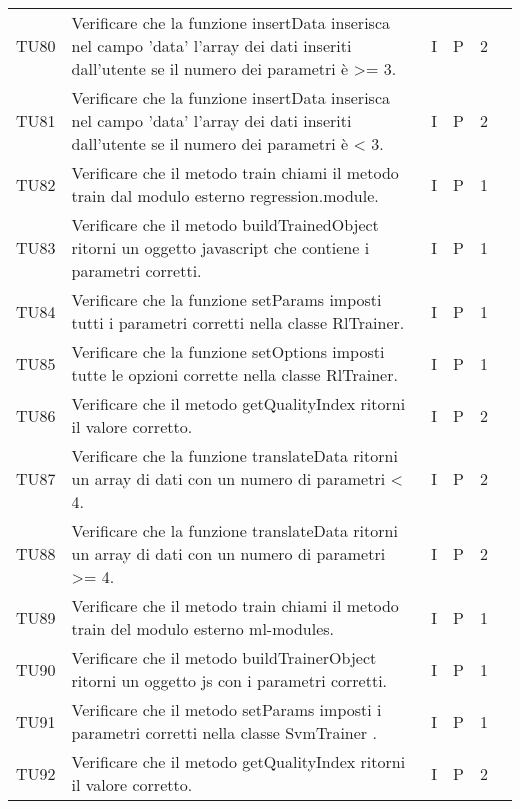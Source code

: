 \begin{longtable} {
		>{}p{12mm}
		>{}p{79.5mm}
		>{}p{9mm}
		>{}p{8mm}
		>{}p{14mm}
		>{}p{0mm}}
	TU80		& Verificare che la funzione insertData inserisca nel campo 'data' l'array dei dati inseriti dall'utente se il numero dei parametri è >= 3. & I & P & 2 & \TBstrut \\ [2mm]
	TU81		& Verificare che la funzione insertData inserisca nel campo 'data' l'array dei dati inseriti dall'utente se il numero dei parametri è < 3. & I & P & 2 & \TBstrut \\ [2mm]
	TU82		& Verificare che il metodo train chiami il metodo train dal modulo esterno regression.module. & I & P & 1 & \TBstrut \\ [2mm]
	TU83		& Verificare che il metodo buildTrainedObject ritorni un oggetto javascript che contiene i parametri corretti. & I & P & 1 & \TBstrut \\ [2mm]
	TU84		& Verificare che la funzione setParams imposti tutti i parametri corretti nella classe RlTrainer. & I & P & 1 & \TBstrut \\ [2mm]
	TU85		& Verificare che la funzione setOptions imposti tutte le opzioni corrette nella classe RlTrainer. & I & P & 1 & \TBstrut \\ [2mm]
	TU86		& Verificare che il metodo getQualityIndex ritorni il valore corretto. & I & P & 2 & \TBstrut \\ [2mm]
	TU87		& Verificare che la funzione translateData ritorni un array di dati con un numero di parametri < 4. & I & P & 2 & \TBstrut \\ [2mm]
	TU88		& Verificare che la funzione translateData ritorni un array di dati con un numero di parametri >= 4. & I & P & 2 & \TBstrut \\ [2mm]
	TU89		& Verificare che il metodo train chiami il metodo train del modulo esterno ml-modules. & I & P & 1 & \TBstrut \\ [2mm]
	TU90		& Verificare che il metodo buildTrainerObject ritorni un oggetto js con i parametri corretti. & I & P & 1 & \TBstrut \\ [2mm]
	TU91		& Verificare che il metodo setParams imposti i parametri corretti nella classe SvmTrainer . & I & P & 1 & \TBstrut \\ [2mm]
	TU92		& Verificare che il metodo getQualityIndex ritorni il valore corretto. & I & P & 2 & \TBstrut \\ [2mm]


\end{longtable}
